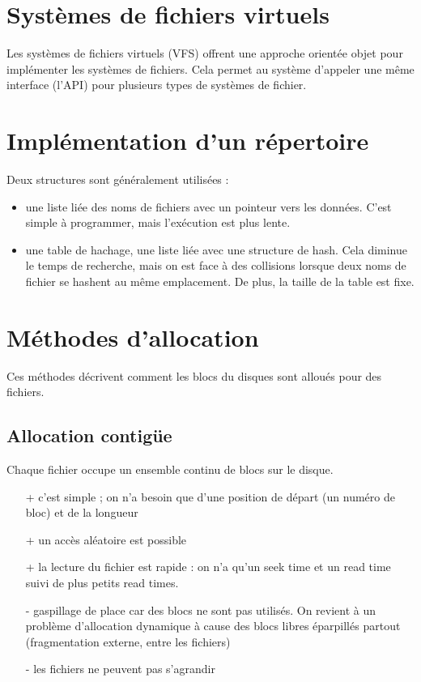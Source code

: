 \section{Systèmes de fichiers virtuels}

Les systèmes de fichiers virtuels (VFS) offrent une approche orientée objet pour implémenter les systèmes de fichiers. Cela permet au système d'appeler une même interface (l'API) pour plusieurs types de systèmes de fichier. 



\section{Implémentation d'un répertoire}

Deux structures sont généralement utilisées :

\begin{itemize}
	\item une liste liée des noms de fichiers avec un pointeur vers les données. C'est simple à programmer, mais l'exécution est plus lente.
	\item une table de hachage, une liste liée avec une structure de hash. Cela diminue le temps de recherche, mais on est face à des collisions lorsque deux noms de fichier se hashent au même emplacement. De plus, la taille de la table est fixe.
\end{itemize}


\section{Méthodes d'allocation}

	Ces méthodes décrivent comment les blocs du disques sont alloués pour des fichiers.

	\subsection{Allocation contigüe}
	
	Chaque fichier occupe un ensemble continu de blocs sur le disque.
	
	\begin{itemize}
		\item[+] c'est simple ; on n'a besoin que d'une position de départ (un numéro de bloc) et de la longueur
		\item[+] un accès aléatoire est possible
		\item[+] la lecture du fichier est rapide : on n'a qu'un seek time et un read time suivi de plus petits read times.
		\item[-] gaspillage de place car des blocs ne sont pas utilisés. On revient à un problème d'allocation dynamique à cause des blocs libres éparpillés partout (fragmentation externe, entre les fichiers)
		\item[-] les fichiers ne peuvent pas s'agrandir
	\end{itemize}
			
